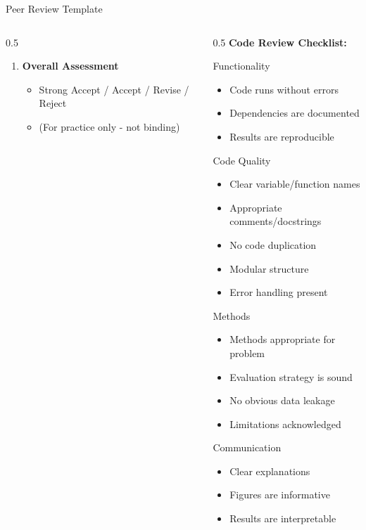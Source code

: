 \begin{frame}[fragile]{Peer Review Template}
\begin{columns}
\begin{column}{0.5\textwidth}
\begin{enumerate}
\item \textbf{Overall Assessment}
   \begin{itemize}
   \item Strong Accept / Accept / Revise / Reject
   \item (For practice only - not binding)
   \end{itemize}
\end{enumerate}
\end{column}

\begin{column}{0.5\textwidth}
\textbf{Code Review Checklist:}

\begin{block}{Functionality}
\begin{itemize}
\item[$\square$] Code runs without errors
\item[$\square$] Dependencies are documented
\item[$\square$] Results are reproducible
\end{itemize}
\end{block}

\begin{block}{Code Quality}
\begin{itemize}
\item[$\square$] Clear variable/function names
\item[$\square$] Appropriate comments/docstrings
\item[$\square$] No code duplication
\item[$\square$] Modular structure
\item[$\square$] Error handling present
\end{itemize}
\end{block}

\begin{block}{Methods}
\begin{itemize}
\item[$\square$] Methods appropriate for problem
\item[$\square$] Evaluation strategy is sound
\item[$\square$] No obvious data leakage
\item[$\square$] Limitations acknowledged
\end{itemize}
\end{block}

\begin{block}{Communication}
\begin{itemize}
\item[$\square$] Clear explanations
\item[$\square$] Figures are informative
\item[$\square$] Results are interpretable
\end{itemize}
\end{block}


\end{column}
\end{columns}
\end{frame}
